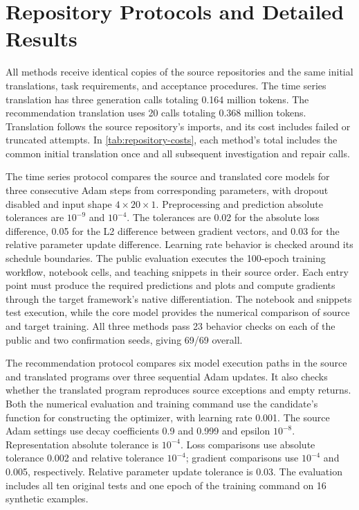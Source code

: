 \section{Repository Protocols and Detailed Results}
\label{sec:repository-results}
All methods receive identical copies of the source repositories and the same initial translations, task requirements, and acceptance procedures. The time series translation has three generation calls totaling 0.164 million tokens. The recommendation translation uses 20 calls totaling 0.368 million tokens. Translation follows the source repository's imports, and its cost includes failed or truncated attempts. In \cref{tab:repository-costs}, each method's total includes the common initial translation once and all subsequent investigation and repair calls.
\begin{table}[!htb]
\caption{Training checks and complete costs for repository migration. Each training signal has nine checks for time series, from three steps on three seeds, and 18 for recommendation, from six model execution paths and three steps on the public seed. Calls, input tokens, and output tokens cover investigation and repair. Tokens reports the total including the common initial translation. Tokens are in millions.}
\label{tab:repository-costs}
\centering
\small
\setlength{\tabcolsep}{2pt}

\end{table}
The time series protocol compares the source and translated core models for three consecutive Adam steps from corresponding parameters, with dropout disabled and input shape $4\times20\times1$. Preprocessing and prediction absolute tolerances are $10^{-9}$ and $10^{-4}$. The tolerances are 0.02 for the absolute loss difference, 0.05 for the L2 difference between gradient vectors, and 0.03 for the relative parameter update difference. Learning rate behavior is checked around its schedule boundaries. The public evaluation executes the 100-epoch training workflow, notebook cells, and teaching snippets in their source order. Each entry point must produce the required predictions and plots and compute gradients through the target framework's native differentiation. The notebook and snippets test execution, while the core model provides the numerical comparison of source and target training. All three methods pass 23 behavior checks on each of the public and two confirmation seeds, giving 69/69 overall.

The recommendation protocol compares six model execution paths in the source and translated programs over three sequential Adam updates. It also checks whether the translated program reproduces source exceptions and empty returns. Both the numerical evaluation and training command use the candidate's function for constructing the optimizer, with learning rate 0.001. The source Adam settings use decay coefficients 0.9 and 0.999 and epsilon $10^{-8}$. Representation absolute tolerance is $10^{-4}$. Loss comparisons use absolute tolerance 0.002 and relative tolerance $10^{-4}$; gradient comparisons use $10^{-4}$ and 0.005, respectively. Relative parameter update tolerance is 0.03. The evaluation includes all ten original tests and one epoch of the training command on 16 synthetic examples.


